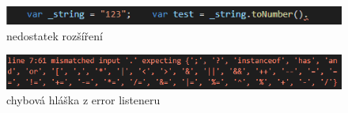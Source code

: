 \begin{figure}
	\centering
	\includegraphics[scale=1]{images/autocomplete_error}
	\caption{nedostatek rozšíření}
	\label{img:autocomplete_error}
\end{figure}

\begin{figure}
	\centering
	\includegraphics[scale=0.8]{images/autocomplete_errormessage}
	\caption{chybová hláška z error listeneru}
	\label{img:autocomplete_errormessage}
\end{figure}
\endinput